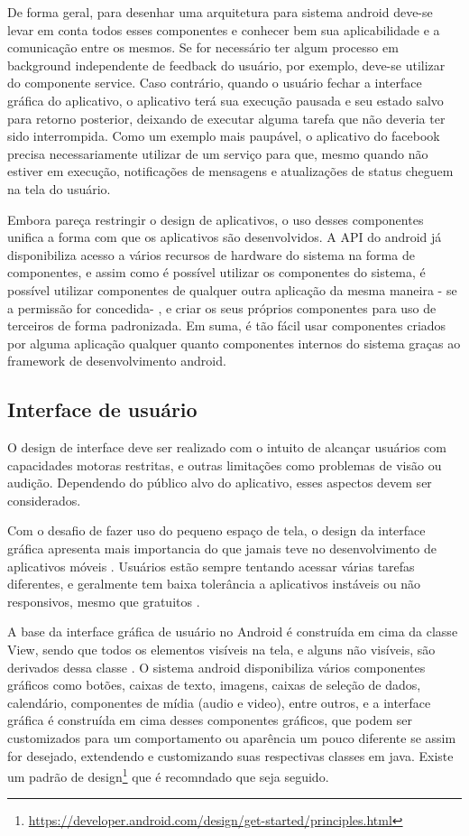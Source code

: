 De forma geral, para desenhar uma arquitetura para sistema android deve-se levar em conta todos esses componentes e conhecer bem sua aplicabilidade e a comunicação entre os mesmos. Se for necessário ter algum processo em background independente de feedback do usuário, por exemplo, deve-se utilizar do componente service. Caso contrário, quando o usuário fechar a interface gráfica do aplicativo, o aplicativo terá sua execução pausada e seu estado salvo para retorno posterior, deixando de executar alguma tarefa que não deveria ter sido interrompida. Como um exemplo mais paupável, o aplicativo do facebook precisa necessariamente utilizar de um serviço para que, mesmo quando não estiver em execução, notificações de mensagens e atualizações de status cheguem na tela do usuário.

Embora pareça restringir o design de aplicativos, o uso desses componentes unifica a forma com que os aplicativos são desenvolvidos. A API do android já disponibiliza acesso a vários recursos de hardware do sistema na forma de componentes, e assim como é possível utilizar os componentes do sistema, é possível utilizar componentes de qualquer outra aplicação da mesma maneira - se a permissão for concedida- , e criar os seus próprios componentes para uso de terceiros de forma padronizada. Em suma, é tão fácil usar componentes criados por alguma aplicação qualquer quanto componentes internos do sistema graças ao framework de desenvolvimento android.

\subsection{Interface de usuário}

O design de interface deve ser realizado com o intuito de alcançar usuários com capacidades motoras restritas, e outras limitações como problemas de visão ou audição. Dependendo do público alvo do aplicativo, esses aspectos devem ser considerados.

Com o desafio de fazer uso do pequeno espaço de tela, o design da interface gráfica apresenta mais importancia do que jamais teve no desenvolvimento de aplicativos móveis \cite{eswissues}. Usuários estão sempre tentando acessar várias tarefas diferentes, e geralmente tem baixa tolerância a aplicativos instáveis ou não responsivos, mesmo que gratuitos \cite{eswmobile}. 

A base da interface gráfica de usuário no Android é construída em cima da classe View, sendo que todos os elementos visíveis na tela, e alguns não visíveis, são derivados dessa classe \cite{androidarch2010}. O sistema android disponibiliza vários componentes gráficos como botões, caixas de texto, imagens, caixas de seleção de dados, calendário, componentes de mídia (audio e video), entre outros, e a interface gráfica é construída em cima desses componentes gráficos, que podem ser customizados para um comportamento ou aparência um pouco diferente se assim for desejado, extendendo e customizando suas respectivas classes em java. Existe um padrão de design\footnote{\url{https://developer.android.com/design/get-started/principles.html}} que é recomndado que seja seguido.

